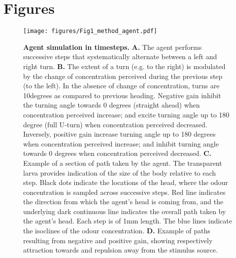 \documentclass[10pt,a4paper]{article}
\begin{document}
\section{Figures}

\begin{figure}[!ht]
\begin{center}
\texttt{[image: figures/Fig1\_method\_agent.pdf]}
\caption{
{\bf Agent simulation in timesteps.} {\bf A.} The agent performs successive steps that systematically alternate between a left and right turn. {\bf B.} The extent of a turn (e.g. to the right) is modulated by the change of concentration perceived during the previous step (to the left). In the absence of change of concentration, turns are 10degrees as compared to previous heading. Negative gain inhibit the turning angle towards 0 degrees (straight ahead) when concentration perceived increase; and excite turning angle up to 180 degree (full U-turn) when concentration perceived decreased. Inversely, positive gain increase turning angle up to 180 degrees when concentration perceived increase; and inhibit turning angle towards 0 degrees when concentration perceived decreased.
{\bf C.} Example of a section of path taken by the agent. The transparent larva provides indication of the size of the body relative to each step. Black dots indicate the locations of the head, where the odour concentration is sampled across successive steps. Red line indicates the direction from which the agent’s head is coming from, and the underlying dark continuous line indicates the overall path taken by the agent’s head. Each step is of 1mm length. The blue lines indicate the isoclines of the odour concentration.
{\bf D.} Example of paths resulting from negative and positive gain, showing respectively attraction towards and repulsion away from the stimulus source.
\label{fig:Fig1}}
\end{center}
\end{figure}
\end{document}
